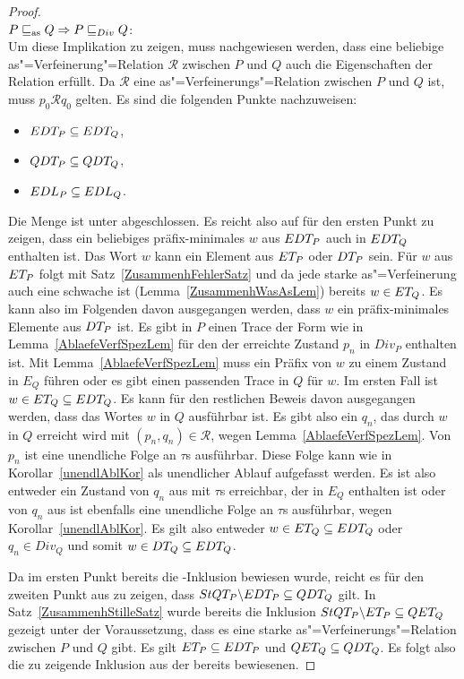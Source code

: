 \begin{proof}\mbox{}\\
  $P \sqsubseteq _{\mathrm{as}} Q \Rightarrow P  \sqsubseteq  _{Div} Q$:\\
  Um diese Implikation zu zeigen, muss nachgewiesen werden, dass eine beliebige
  as"=Verfeinerung"=Relation $\mathcal{R}$ zwischen $P$ und $Q$ auch die
  Eigenschaften der Relation \DRel{} erfüllt. Da $\mathcal{R}$ eine
  as"=Verfeinerungs"=Relation zwischen $P$ und $Q$ ist, muss $p_0 \mathcal{R}
  q_0$ gelten. Es sind die folgenden Punkte nachzuweisen:
  \begin{itemize}
    \item $EDT _P \subseteq EDT _Q$,
    \item $QDT _P \subseteq QDT _Q$,
    \item $EDL _P \subseteq EDL _Q$.
  \end{itemize}

  Die Menge \EDT{} ist unter \cont{} abgeschlossen. Es reicht also auf für den
  ersten Punkt zu zeigen, dass ein beliebiges präfix-minimales $w$ aus $EDT
  _P$ auch in $EDT _Q$ enthalten ist. Das Wort $w$ kann ein Element aus $ET
  _P$ oder $DT _P$ sein. Für $w$ aus $ET _P$ folgt mit
  Satz~\ref{ZusammenhFehlerSatz} und da jede starke as"=Verfeinerung auch eine
  schwache ist (Lemma~\ref{ZusammenhWasAsLem}) bereits $w\in ET _Q$. Es kann
  also im Folgenden davon ausgegangen werden, dass $w$ ein präfix-minimales
  Elemente aus $DT _P$ ist. Es gibt in $P$ einen Trace der Form wie in
  Lemma~\ref{AblaefeVerfSpezLem} für den der erreichte Zustand $p_n$ in $Div_P$
  enthalten ist. Mit Lemma~\ref{AblaefeVerfSpezLem} muss ein Präfix von $w$ zu
  einem Zustand in $E_Q$ führen oder es gibt einen passenden Trace in $Q$ für
  $w$. Im ersten Fall ist $w\in ET _Q \subseteq EDT _Q$. Es kann für den
  restlichen Beweis davon ausgegangen werden, dass das Wortes $w$ in $Q$
  ausführbar ist. Es gibt also ein $q_n$, das durch $w$ in $Q$ erreicht wird
  mit $(p_n,q_n)\in\mathcal{R}$, wegen Lemma~\ref{AblaefeVerfSpezLem}. Von
  $p_n$ ist eine unendliche Folge an $\tau$s ausführbar. Diese Folge kann wie
  in Korollar~\ref{unendlAblKor} als unendlicher Ablauf aufgefasst werden. Es
  ist also entweder ein Zustand von $q_n$ aus mit $\tau$s erreichbar, der in
  $E_Q$ enthalten ist oder von $q_n$ aus ist ebenfalls eine unendliche Folge an
  $\tau$s ausführbar, wegen Korollar~\ref{unendlAblKor}. Es gilt also
  entweder $w\in ET _Q\subseteq EDT _Q$ oder $q_n\in Div _Q$ und somit $w\in DT
  _Q\subseteq EDT _Q$.

  Da im ersten Punkt bereits die \EDT{}-Inklusion bewiesen wurde, reicht es
  für den zweiten Punkt aus zu zeigen, dass $StQT _P\backslash EDT _P
  \subseteq QDT _Q$ gilt. In Satz~\ref{ZusammenhStilleSatz} wurde bereits die
  Inklusion $StQT _P \backslash ET _P \subseteq QET _Q$ gezeigt unter der
  Voraussetzung, dass es eine starke as"=Verfeinerungs"=Relation zwischen
  $P$ und $Q$ gibt. Es gilt $ET _P \subseteq EDT _P$ und $QET _Q \subseteq
  QDT _Q$. Es folgt also die zu zeigende Inklusion aus der bereits bewiesenen.


\end{proof}
